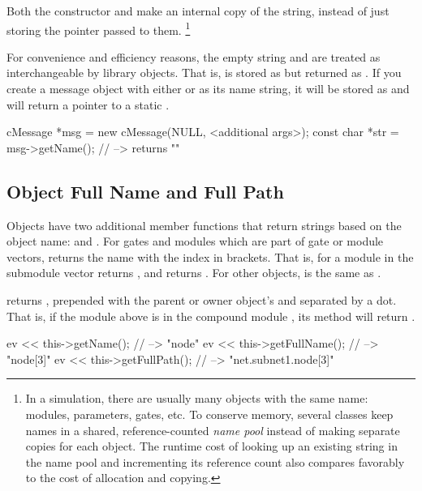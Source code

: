 Both the constructor and  make an internal copy of the string,
instead of just storing the pointer passed to them.
  \footnote{In a simulation, there are usually many objects with the same name:
  modules, parameters, gates, etc. To conserve memory, several classes
  keep names in a shared, reference-counted \textit{name pool} instead of
  making separate copies for each object. The runtime cost of looking up an
  existing string in the name pool and incrementing its reference count
  also compares favorably to the cost of allocation and copying.}

For convenience and efficiency reasons, the empty string 
and  are treated as interchangeable by library objects.
That is,  is stored as  but returned as .
If you create a message object with either 
or  as its name string, it will be stored as 
and  will return a pointer to a static .

\begin{cpp}
cMessage *msg = new cMessage(NULL, <additional args>);
const char *str = msg->getName(); // --> returns ""
\end{cpp}


\subsection{Object Full Name and Full Path}
\label{sec:sim-lib:fullname-and-fullpath}


Objects have two additional member functions that return strings
based on the object name:  and .
For gates and modules which are part of gate or module vectors,
 returns the name with the index in brackets.
That is, for a module  in the submodule vector 
 returns , and  returns .
For other objects,  is the same as .

 returns , prepended with the
parent or owner object's  and separated by a dot.
That is, if the  module above is in the compound module
, its  method will return
.

\begin{cpp}
ev << this->getName();     // --> "node"
ev << this->getFullName(); // --> "node[3]"
ev << this->getFullPath(); // --> "net.subnet1.node[3]"
\end{cpp}

